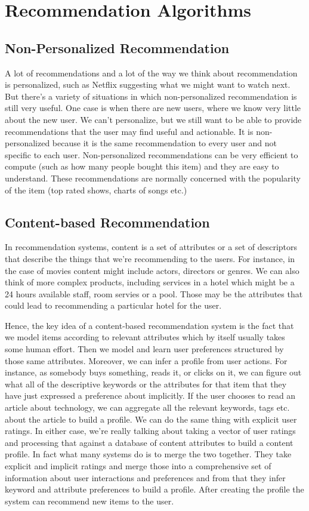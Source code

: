 \documentclass[12pt,a4paper]{report}
\begin{document}
\section{Recommendation Algorithms}

\subsection{Non-Personalized Recommendation}

 A lot of recommendations and a lot of the way we think about recommendation is personalized, such as Netflix suggesting what we might want to watch next. But there's a variety of situations in which non-personalized recommendation is still very useful. One case is when there are new users, where we know very little about the new user. We can't personalize, but we still want to be able to provide recommendations that the user may find useful and actionable. It is non-personalized because it is the same recommendation to every user and not specific to each user. Non-personalized recommendations can be very efficient to compute (such as how many people bought this item) and they are easy to understand. These recommendations are normally concerned with the popularity of the item (top rated shows, charts of songs etc.)
 
 \subsection{Content-based Recommendation}
 
In recommendation systems, content is a set of attributes or a set of descriptors that describe the things that we're
recommending to the users. For instance, in the case of movies content might include actors, directors or genres. We can also think of more complex products, including services in a hotel which might be a 24 hours available staff, room servies or a pool. Those may be the attributes that could lead to recommending a particular hotel for the user.

Hence, the key idea of a content-based recommendation system is the fact that we model items according to relevant attributes which by itself usually takes some human effort. Then we model and learn user preferences structured by those same attributes. Moreover, we can infer a profile from user actions. For instance, as somebody buys something, reads it, or clicks on it, we can figure out what all of the descriptive keywords or the attributes for that item that they have just expressed a preference about implicitly. If the user chooses to read an article about technology, we can aggregate all the relevant keywords, tags etc. about the article to build a profile. We can do the same thing with explicit user ratings. In either case, we're really talking about taking a vector of user ratings and processing that against a database of content attributes to build a content profile.
In fact what many systems do is to merge the two together.
They take explicit and implicit ratings and merge those
into a comprehensive set of information about user interactions and preferences and from that they infer keyword and attribute
preferences to build a profile. After creating the profile the system can recommend new items to the user.
\end{document}
